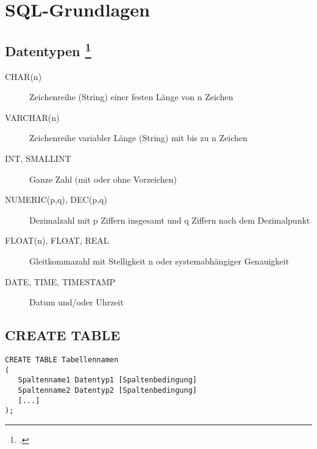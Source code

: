 \documentclass{lehramt-informatik-haupt}
\begin{document}

\chapter{SQL-Grundlagen}

%

\section{Datentypen
\footcite[Seite 132]{winter}}

\begin{description}
\item[CHAR(n)] Zeichenreihe (String) einer festen Länge von n Zeichen

\item[VARCHAR(n)] Zeichenreihe variabler Länge (String) mit bis zu n
Zeichen

\item[INT, SMALLINT] Ganze Zahl (mit oder ohne Vorzeichen)

\item[NUMERIC(p,q), DEC(p,q)] Dezimalzahl mit p Ziffern insgesamt und q
Ziffern nach dem Dezimalpunkt

\item[FLOAT(n), FLOAT, REAL] Gleitkommazahl mit Stelligkeit n oder
systemabhängiger Genauigkeit

\item[DATE, TIME, TIMESTAMP] Datum und/oder Uhrzeit
\end{description}

\section{CREATE TABLE}

\begin{verbatim}
CREATE TABLE Tabellennamen
(
   Spaltenname1 Datentyp1 [Spaltenbedingung]
   Spaltenname2 Datentyp2 [Spaltenbedingung]
   [...]
);
\end{verbatim}

%
\end{document}
